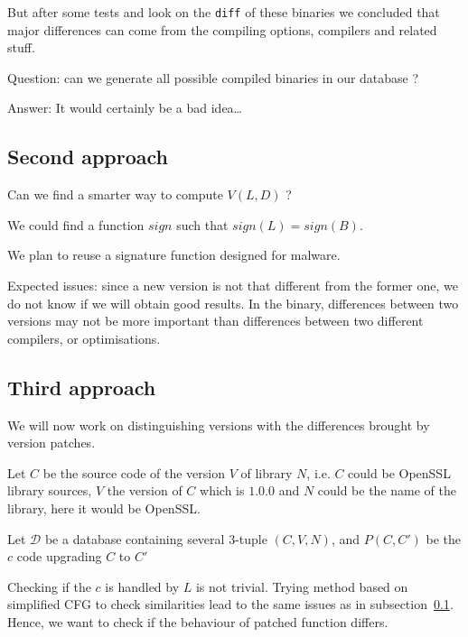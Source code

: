 \documentclass{article}
\newcommand{\signature}{{sign}}
\begin{document}
    But after some tests and look on the \verb|diff| of these binaries we
    concluded that major differences can come from the compiling options,
    compilers and related stuff.

    Question: can we generate all possible compiled binaries in our database ? 
    
    Answer: It would certainly be a bad idea\dots

    \subsection{Second approach}\label{approach-sign}
    Can we find a smarter way to compute $V(L,D)$ ?

    We could find a function $\signature$ such that $\signature(L) =
    \signature(B)$.

    We plan to reuse a signature function designed for malware.

    Expected issues: since a new version is not that different from the former
    one, we do not know if we will obtain good results. In the binary, differences between two versions may not be more important than differences between two different compilers, or optimisations.

    \subsection{Third approach}
    

    We will now work on distinguishing versions with the differences brought
    by version patches.


    Let $C$ be the source code of the version $V$ of library $N$,
    i.e. $C$ could be OpenSSL library sources, $V$ the version of $C$ which
    is $1.0.0$ and $N$ could be the name of the library, here it would be OpenSSL.

    Let $\mathcal{D}$ be a database containing several $3$-tuple $(C,V,N)$, and $P(C, C')$ be the $c$ code upgrading $C$ to $C'$

    Checking if the $c$ is handled by $L$ is not trivial. Trying method based on simplified CFG to check similarities lead to the same issues as in subsection~\ref{approach-sign}. Hence, we want to check
    if the behaviour of patched function differs.
\end{document}
